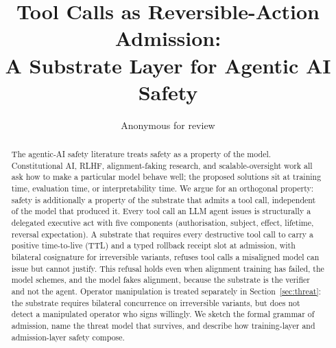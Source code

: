 \documentclass[11pt]{article}
\title{Tool Calls as Reversible-Action Admission:\\
A Substrate Layer for Agentic AI Safety}
\author{Anonymous for review}
\date{}
\begin{document}
\maketitle

\begin{abstract}
The agentic-AI safety literature treats safety as a property of the model. Constitutional AI, RLHF, alignment-faking research, and scalable-oversight work all ask how to make a particular model behave well; the proposed solutions sit at training time, evaluation time, or interpretability time. We argue for an orthogonal property: safety is additionally a property of the substrate that admits a tool call, independent of the model that produced it. Every tool call an LLM agent issues is structurally a delegated executive act with five components (authorisation, subject, effect, lifetime, reversal expectation). A substrate that requires every destructive tool call to carry a positive time-to-live (TTL) and a typed rollback receipt slot at admission, with bilateral cosignature for irreversible variants, refuses tool calls a misaligned model can issue but cannot justify. This refusal holds even when alignment training has failed, the model schemes, and the model fakes alignment, because the substrate is the verifier and not the agent. Operator manipulation is treated separately in Section~\ref{sec:threat}: the substrate requires bilateral concurrence on irreversible variants, but does not detect a manipulated operator who signs willingly. We sketch the formal grammar of admission, name the threat model that survives, and describe how training-layer and admission-layer safety compose.
\end{abstract}













\end{document}
